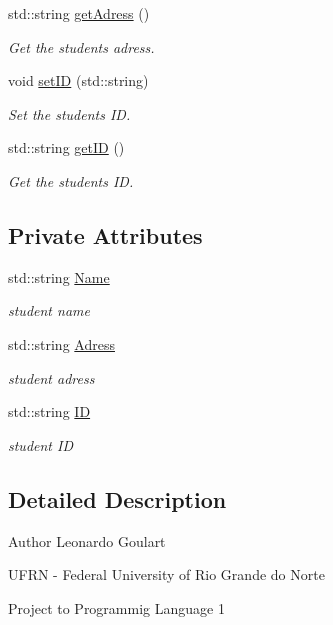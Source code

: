 \begin{DoxyCompactItemize}
std\+::string \hyperlink{classStudent_aeb78f390f160a1bcad595e7487cdf881}{get\+Adress} ()
\begin{DoxyCompactList}\small\item\em Get the student\textquotesingle{}s adress. \end{DoxyCompactList}\item 
void \hyperlink{classStudent_ab9bba1e271f7aebdbba115311873482a}{set\+ID} (std\+::string)
\begin{DoxyCompactList}\small\item\em Set the student\textquotesingle{}s ID. \end{DoxyCompactList}\item 
std\+::string \hyperlink{classStudent_a87fcf0ef568c017d246b559c31db5857}{get\+ID} ()
\begin{DoxyCompactList}\small\item\em Get the student\textquotesingle{}s ID. \end{DoxyCompactList}\end{DoxyCompactItemize}
\subsection*{Private Attributes}
\begin{DoxyCompactItemize}
\item 
std\+::string \hyperlink{classStudent_a914e02c29156e1a3b1b51cad6bbc9083}{Name}
\begin{DoxyCompactList}\small\item\em student name \end{DoxyCompactList}\item 
std\+::string \hyperlink{classStudent_a2ce7f219072c295b7f3bc95db09625f3}{Adress}
\begin{DoxyCompactList}\small\item\em student adress \end{DoxyCompactList}\item 
std\+::string \hyperlink{classStudent_a1ae2688ebf463a93d001465c510f8970}{ID}
\begin{DoxyCompactList}\small\item\em student ID \end{DoxyCompactList}\end{DoxyCompactItemize}


\subsection{Detailed Description}
\begin{DoxyAuthor}{Author}
Leonardo Goulart 

U\+F\+RN -\/ Federal University of Rio Grande do Norte 

Project to Programmig Language 1 
\end{DoxyAuthor}



